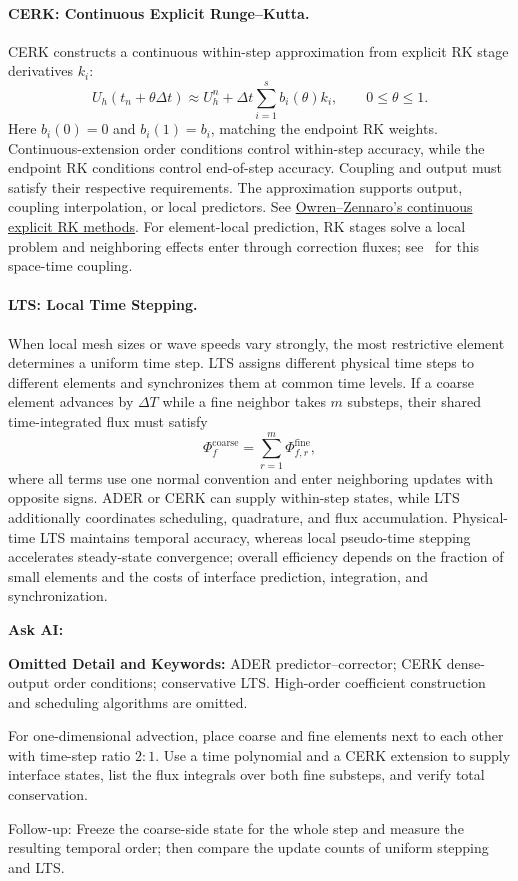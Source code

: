 \paragraph{CERK: Continuous Explicit Runge--Kutta.}
CERK constructs a continuous within-step approximation from explicit RK stage derivatives $k_i$:
\[
U_h(t_n+\theta\Delta t)\approx
U_h^n+\Delta t\sum_{i=1}^{s}b_i(\theta)k_i,\qquad 0\le\theta\le1.
\]
Here $b_i(0)=0$ and $b_i(1)=b_i$, matching the endpoint RK weights.
Continuous-extension order conditions control within-step accuracy, while the endpoint RK conditions control end-of-step accuracy. Coupling and output must satisfy their respective requirements.
The approximation supports output, coupling interpolation, or local predictors. See
\href{https://doi.org/10.1137/0913084}{Owren--Zennaro's continuous explicit RK methods}.
For element-local prediction, RK stages solve a local problem and neighboring effects enter through correction fluxes;
see~\cite{altmann2010} for this space-time coupling.

\paragraph{LTS: Local Time Stepping.}
When local mesh sizes or wave speeds vary strongly, the most restrictive element determines a uniform time step.
LTS assigns different physical time steps to different elements and synchronizes them at common time levels.
If a coarse element advances by $\Delta T$ while a fine neighbor takes $m$ substeps, their shared time-integrated flux must satisfy
\[
\Phi_f^{\mathrm{coarse}}
=\sum_{r=1}^{m}\Phi_{f,r}^{\mathrm{fine}},
\]
where all terms use one normal convention and enter neighboring updates with opposite signs.
ADER or CERK can supply within-step states, while LTS additionally coordinates scheduling, quadrature, and flux accumulation. Physical-time LTS maintains temporal accuracy, whereas local pseudo-time stepping accelerates steady-state convergence; overall efficiency depends on the fraction of small elements and the costs of interface prediction, integration, and synchronization.

\begin{askai}
\textbf{Ask AI:}\par
\textbf{Omitted Detail and Keywords:} ADER predictor--corrector; CERK dense-output order conditions; conservative LTS. High-order coefficient construction and scheduling algorithms are omitted.

For one-dimensional advection, place coarse and fine elements next to each other with time-step ratio $2:1$. Use a time polynomial and a CERK extension to supply interface states, list the flux integrals over both fine substeps, and verify total conservation.

Follow-up: Freeze the coarse-side state for the whole step and measure the resulting temporal order; then compare the update counts of uniform stepping and LTS.
\end{askai}

